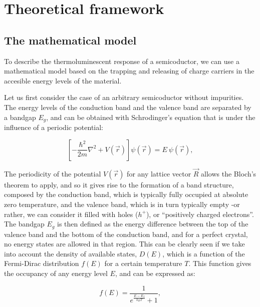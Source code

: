 \chapter{Theoretical framework}


\section{The mathematical model} \label{sec:modelo}

To describe the thermoluminescent response of a semicoductor, we can use a mathematical model based on the trapping and releasing of charge carriers in the accesible energy levels of the material. 

\vspace{10pt}

Let us first consider the case of an arbitrary semicoductor without impurities. The energy levels of the conduction band and the valence band are separated by a bandgap $E_g$, and can be obtained with Schrodinger's equation that is under the influence of a periodic potential:

\begin{equation} \label{eq:schrodinger}
  \left[ -\frac{\hbar^2}{2m} \nabla^2 + V(\vec{r}) \right] \psi(\vec{r}) = E ~ \psi(\vec{r}),
\end{equation}

\vspace{10pt}
The periodicity of the potential $V(\vec{r})$ for any lattice vector $\vec{R}$ allows the Bloch's theorem to apply, and so it gives rise to the formation of a band structure, composed by the conduction band, which is typically fully occupied at absolute zero temperature, and the valence band, which is in turn typically empty -or rather, we can consider it filled with holes ($h^+$), or ``positively charged electrons''. The bandgap $E_g$ is then defined as the energy difference between the top of the valence band and the bottom of the conduction band, and for a perfect crystal, no energy states are allowed in that region. This can be clearly seen if we take into account the density of available states, $D(E)$, which is a function of the Fermi-Dirac distribution $f(E)$ for a certain temperature $T$. This function gives the occupancy of any energy level $E$, and can be expressed as:

\begin{equation} \label{eq:fermidirac}
  f(E) = \frac{1}{e^{\frac{E - E_f}{k_B T}} + 1},
\end{equation}


